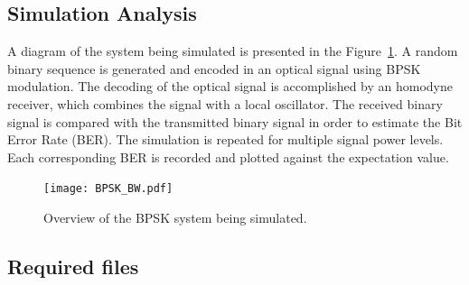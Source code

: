 \subsection{Simulation Analysis}

A diagram of the system being simulated is presented in the Figure~\ref{fig:homodynesystem}. A random binary sequence is generated and encoded in an optical signal using BPSK modulation. The decoding of the optical signal is accomplished by an homodyne receiver, which combines the signal with a local oscillator. The received binary signal is compared with the transmitted binary signal in order to estimate the Bit Error Rate (BER). The simulation is repeated for multiple signal power levels. Each corresponding BER is recorded and plotted against the expectation value.

\begin{figure}[h]
\centering
\texttt{[image: BPSK\_BW.pdf]}
\caption{Overview of the BPSK system being simulated.}
\label{fig:homodynesystem}
\end{figure}

\subsection*{Required files}\label{Required files}

